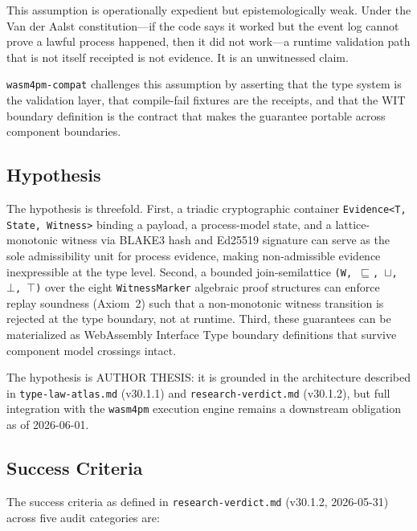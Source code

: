 This assumption is operationally expedient but epistemologically weak. Under the Van der
Aalst constitution---if the code says it worked but the event log cannot prove a lawful
process happened, then it did not work---a runtime validation path that is not itself
receipted is not evidence. It is an unwitnessed claim.

\texttt{wasm4pm-compat} challenges this assumption by asserting that the type system is
the validation layer, that compile-fail fixtures are the receipts, and that the WIT
boundary definition is the contract that makes the guarantee portable across component
boundaries.

\subsection{Hypothesis}
\label{sec:sources-wasm4pm-compat-question-hypothesis}

The hypothesis is threefold. First, a triadic cryptographic container
\texttt{Evidence<T, State, Witness>} binding a payload, a process-model state, and a
lattice-monotonic witness via BLAKE3 hash and Ed25519 signature can serve as the
sole admissibility unit for process evidence, making non-admissible evidence
inexpressible at the type level. Second, a bounded join-semilattice \texttt{(W, \(\sqsubseteq\),
\(\sqcup\), \(\bot\), \(\top\))} over the eight \texttt{WitnessMarker} algebraic proof
structures can enforce replay soundness (Axiom~2) such that a non-monotonic witness
transition is rejected at the type boundary, not at runtime. Third, these guarantees
can be materialized as WebAssembly Interface Type boundary definitions that survive
component model crossings intact.

The hypothesis is AUTHOR THESIS: it is grounded in the architecture described in
\texttt{type-law-atlas.md} (v30.1.1) and \texttt{research-verdict.md} (v30.1.2), but
full integration with the \texttt{wasm4pm} execution engine remains a downstream obligation
as of 2026-06-01.

\subsection{Success Criteria}
\label{sec:sources-wasm4pm-compat-question-criteria}

The success criteria as defined in \texttt{research-verdict.md} (v30.1.2, 2026-05-31)
across five audit categories are:

